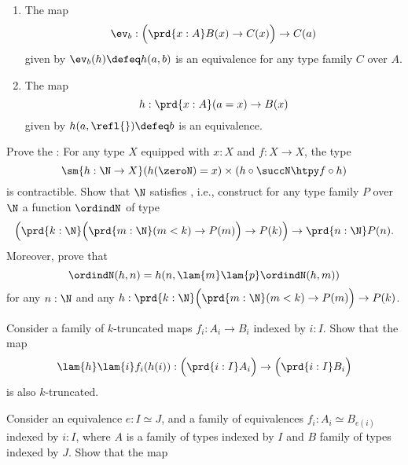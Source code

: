 \begin{exercises}
  \begin{enumerate}
  \item The map
    \begin{equation*}
      \ev_b:\Big(\prd{x:A}B(x)\to C(x)\Big)\to C(a)
    \end{equation*}
    given by $\ev_b(h)\defeq h(a,b)$ is an equivalence for any type family $C$ over $A$.
  \item The map
    \begin{equation*}
      h:\prd{x:A}(a=x)\to B(x)
    \end{equation*}
    given by $h(a,\refl{})\defeq b$ is an equivalence.
  \end{enumerate}
  \exitem Prove the : For any type $X$ equipped with $x:X$ and $f:X\to X$, the type
  \begin{equation*}
    \sm{h:\N\to X} (h(\zeroN)= x)\times (h\circ \succN\htpy f\circ h)
  \end{equation*}
  is contractible.
  \exitem Show that $\N$ satisfies , i.e., construct for any type family $P$ over $\N$ a function $\ordindN$ of type
  \begin{equation*}
    \Big(\prd{k:\N} \Big(\prd{m:\N} (m< k) \to P(m)\Big)\to P(k)\Big) \to \prd{n:\N}P(n).
  \end{equation*}
  Moreover, prove that
  \begin{equation*}
    \ordindN(h,n)=h(n,\lam{m}\lam{p}\ordindN(h,m))
  \end{equation*}
  for any $n:\N$ and any $h:\prd{k:\N}\Big(\prd{m:\N}(m<k)\to P(m)\Big)\to P(k)$.
  \exitem \label{ex:equiv-pi} 
  \begin{subexenum}
  \item Consider a family of $k$-truncated maps $f_i:A_i\to B_i$ indexed by $i:I$. Show that the map
    \begin{equation*}
      \lam{h}\lam{i}f_i(h(i)): \Big(\prd{i:I}A_i\Big)\to\Big(\prd{i:I}B_i\Big)
    \end{equation*}
    is also $k$-truncated.
  \item Consider an equivalence $e:I\simeq J$, and a family of equivalences $f_i:A_i\simeq B_{e(i)}$ indexed by $i:I$, where $A$ is a family of types indexed by $I$ and $B$ family of types indexed by $J$. Show that the map
    \begin{equation*}

\end{equation*}
\end{subexenum}
\end{exercises}
